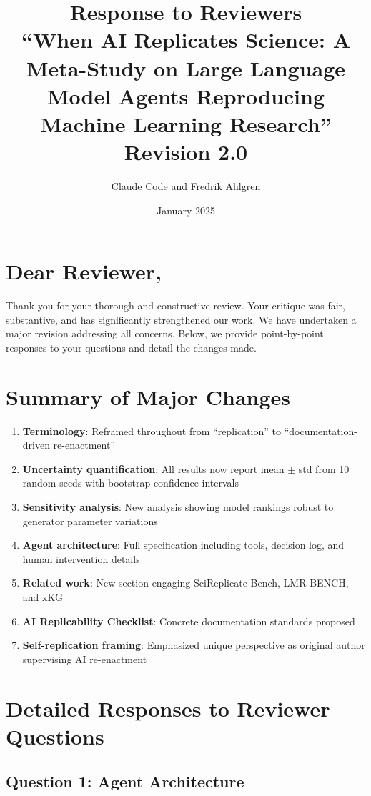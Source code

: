 \documentclass[11pt]{article}
\title{Response to Reviewers\\[0.5em]
\large ``When AI Replicates Science: A Meta-Study on Large Language Model Agents Reproducing Machine Learning Research''\\[0.5em]
\normalsize Revision 2.0}
\author{Claude Code and Fredrik Ahlgren}
\date{January 2025}
\begin{document}
\maketitle

\section*{Dear Reviewer,}

Thank you for your thorough and constructive review. Your critique was fair, substantive, and has significantly strengthened our work. We have undertaken a major revision addressing all concerns. Below, we provide point-by-point responses to your questions and detail the changes made.

\section*{Summary of Major Changes}

\begin{enumerate}
    \item \textbf{Terminology}: Reframed throughout from ``replication'' to ``documentation-driven re-enactment''
    \item \textbf{Uncertainty quantification}: All results now report mean $\pm$ std from 10 random seeds with bootstrap confidence intervals
    \item \textbf{Sensitivity analysis}: New analysis showing model rankings robust to generator parameter variations
    \item \textbf{Agent architecture}: Full specification including tools, decision log, and human intervention details
    \item \textbf{Related work}: New section engaging SciReplicate-Bench, LMR-BENCH, and xKG
    \item \textbf{AI Replicability Checklist}: Concrete documentation standards proposed
    \item \textbf{Self-replication framing}: Emphasized unique perspective as original author supervising AI re-enactment
\end{enumerate}

\section*{Detailed Responses to Reviewer Questions}

\subsection*{Question 1: Agent Architecture}
\end{document}
